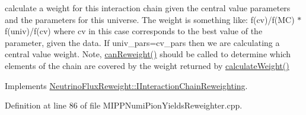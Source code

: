 calculate a weight for this interaction chain given the central value parameters and the parameters for this universe. The weight is something like\-: f(cv)/f(M\-C) $\ast$ f(univ)/f(cv) where cv in this case corresponds to the best value of the parameter, given the data. If univ\-\_\-pars=cv\-\_\-pars then we are calculating a central value weight. Note, \hyperlink{class_neutrino_flux_reweight_1_1_m_i_p_p_numi_pion_yields_reweighter_a6a716b25ddb7d29ace9c7f07d84c91b2}{can\-Reweight()} should be called to determine which elements of the chain are covered by the weight returned by \hyperlink{class_neutrino_flux_reweight_1_1_m_i_p_p_numi_pion_yields_reweighter_a84ef113a8ef34c2f9f5813938ec35382}{calculate\-Weight()} 



Implements \hyperlink{class_neutrino_flux_reweight_1_1_i_interaction_chain_reweighting_ae28403553637013fdc720674ee24c7c5}{Neutrino\-Flux\-Reweight\-::\-I\-Interaction\-Chain\-Reweighting}.



Definition at line 86 of file M\-I\-P\-P\-Numi\-Pion\-Yields\-Reweighter.\-cpp.


